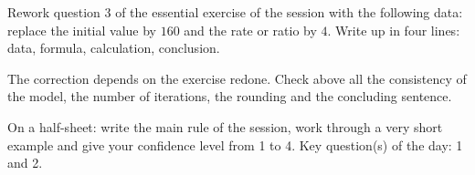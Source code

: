 
\begin{homework}Rework question 3 of the essential exercise of the session with the following data: replace the initial value by $160$ and the rate or ratio by $4$. Write up in four lines: data, formula, calculation, conclusion.\end{homework}
\begin{solution}The correction depends on the exercise redone. Check above all the consistency of the model, the number of iterations, the rounding and the concluding sentence.\end{solution}

\begin{exitticket}[3 minutes]On a half-sheet: write the main rule of the session, work through a very short example and give your confidence level from 1 to 4. Key question(s) of the day: 1 and 2.\end{exitticket}

